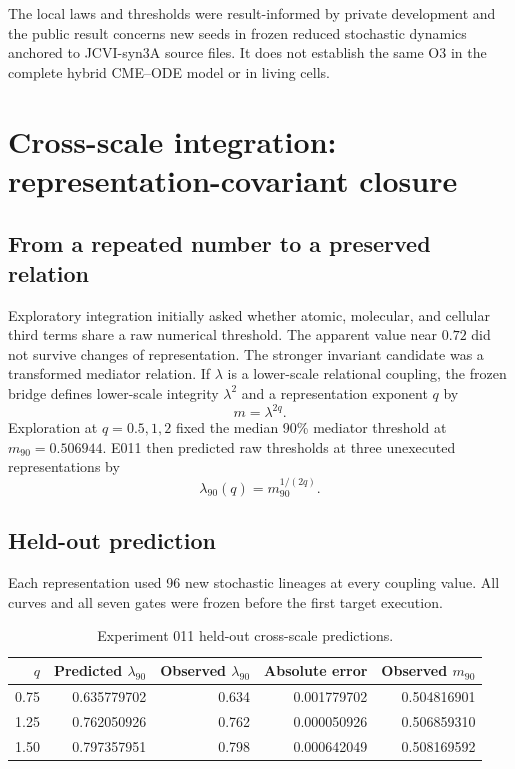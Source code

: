 \documentclass[11pt,a4paper]{article}
\begin{document}
The local laws and thresholds were result-informed by private development and the public result concerns new seeds in frozen reduced stochastic dynamics anchored to JCVI-syn3A source files. It does not establish the same O3 in the complete hybrid CME--ODE model or in living cells.

\section{Cross-scale integration: representation-covariant closure}

\subsection{From a repeated number to a preserved relation}

Exploratory integration initially asked whether atomic, molecular, and cellular third terms share a raw numerical threshold. The apparent value near $0.72$ did not survive changes of representation. The stronger invariant candidate was a transformed mediator relation. If $\lambda$ is a lower-scale relational coupling, the frozen bridge defines lower-scale integrity $\lambda^2$ and a representation exponent $q$ by
\begin{equation}
 m=\lambda^{2q}.
 \label{eq:renormalized-bridge}
\end{equation}
Exploration at $q=0.5,1,2$ fixed the median 90\% mediator threshold at $m_{90}=0.506944$. E011 then predicted raw thresholds at three unexecuted representations by
\begin{equation}
 \lambda_{90}(q)=m_{90}^{1/(2q)}.
\end{equation}

\subsection{Held-out prediction}

Each representation used 96 new stochastic lineages at every coupling value. All curves and all seven gates were frozen before the first target execution.

\begin{table}[H]
\centering
\footnotesize
\caption{Experiment 011 held-out cross-scale predictions.}
\begin{tabular}{@{}rrrrr@{}}
\toprule
$q$ & Predicted $\lambda_{90}$ & Observed $\lambda_{90}$ & Absolute error & Observed $m_{90}$ \\
\midrule
0.75 & 0.635779702 & 0.634 & 0.001779702 & 0.504816901 \\
1.25 & 0.762050926 & 0.762 & 0.000050926 & 0.506859310 \\
1.50 & 0.797357951 & 0.798 & 0.000642049 & 0.508169592 \\
\bottomrule
\end{tabular}
\end{table}
\end{document}
